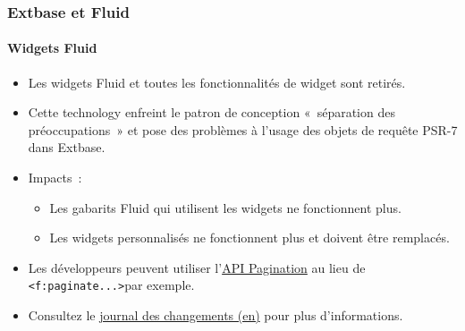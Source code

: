 %

\begin{frame}[fragile]
	\frametitle{Extbase et Fluid}
	\framesubtitle{Widgets Fluid}


	\begin{itemize}
		\item Les widgets Fluid et toutes les fonctionnalités de widget sont retirés.
		\item Cette technology enfreint le patron de conception «~séparation des préoccupations~»
			et pose des problèmes à l'usage des objets de requête PSR-7 dans Extbase.
		\item Impacts~:
			\begin{itemize}
				\item Les gabarits Fluid qui utilisent les widgets ne fonctionnent plus.
				\item Les widgets personnalisés ne fonctionnent plus et doivent être remplacés.
			\end{itemize}
		\item Les développeurs peuvent utiliser
			l'\href{https://docs.typo3.org/m/typo3/reference-coreapi/master/en-us/ApiOverview/Pagination/Index.html}{API Pagination}
			au lieu de\newline
			\smaller\texttt{<f:paginate...>}\normalsize\tabto{2.8cm}par exemple.
		\item Consultez le \href{https://docs.typo3.org/c/typo3/cms-core/master/en-us/Changelog/10.0/Breaking-92529-AllFluidWidgetFunctionalityRemoved.html}{journal des changements (en)}
			pour plus d'informations.
	\end{itemize}

\end{frame}

